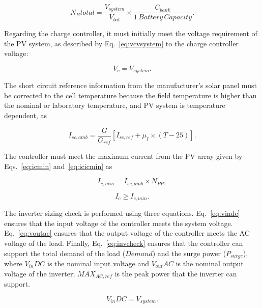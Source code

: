 \documentclass[journal]{IEEEtran}
\begin{document}
\begin{equation}
\label{eq:Nbtotal2}
N_{B}total = \dfrac{V_{system}}{V_{bat}} \times \dfrac{C_{bank}}{1 \,Battery \, Capacity}.
\end{equation}

Regarding the charge controller, it must initially meet the voltage requirement of the PV system, as described by Eq.~\eqref{eq:vcvsystem} to the charge controller voltage: 

\begin{equation}
\label{eq:vcvsystem}
V_{c} = V_{system}.
\end{equation}

The short circuit reference information from the manufacturer's solar panel must be corrected 
to the cell temperature because the field temperature is higher than the nominal or laboratory temperature, and PV system is temperature dependent, as 

\begin{equation}
\label{eq:iscamb}
I_{sc,amb} = \dfrac{G}{G_{ref}} \left[ I_{sc,ref} + \mu_{I} \times (T-25) \right]. 
\end{equation}

The controller must meet the maximum current from the PV array given by Eqs.~\eqref{eq:icmin} and~\eqref{eq:icicmin} as

\begin{equation}
\label{eq:icmin}
I_{c,min} = I_{sc,amb} \times N_{PP},
\end{equation}

\begin{equation}
\label{eq:icicmin}
I_{c} \geq I_{c,min}.
\end{equation}

The inverter sizing check is performed using three equations. Eq.~\eqref{eq:vindc} ensures that 
the input voltage of the controller meets the system voltage. Eq.~\eqref{eq:voutac} ensures that the 
output voltage of the controller meets the AC voltage of the load. Finally, Eq.~\eqref{eq:invcheck} ensures that 
the controller can support the total demand of the load ($Demand$) and the surge power ($P_{surge}$), 
where $V_{in}DC$ is the nominal input voltage and $V_{out}AC$ is the nominal output voltage of the inverter; 
$MAX_{AC,ref}$ is the peak power that the inverter can support.

\begin{equation}
\label{eq:vindc} 
V_{in}DC = V_{system}.
\end{equation}
\end{document}
